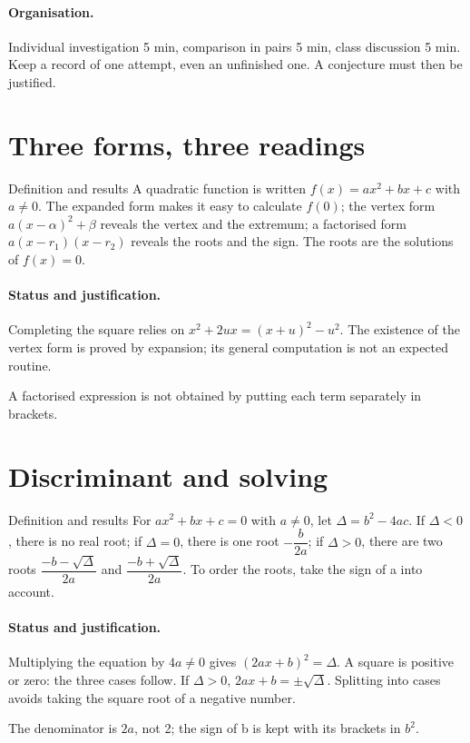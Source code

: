\paragraph{Organisation.} Individual investigation 5 min, comparison in pairs 5 min, class discussion 5 min. Keep a record of one attempt, even an unfinished one. A conjecture must then be justified.
\section{Three forms, three readings}\label{C02-U1}
\begin{repere}{Definition and results}
A quadratic function is written $f(x)=ax^2+bx+c$ with $a\ne0$. The expanded form makes it easy to calculate $f(0)$; the vertex form $a(x-\alpha)^2+\beta$ reveals the vertex and the extremum; a factorised form $a(x-r_1)(x-r_2)$ reveals the roots and the sign. The roots are the solutions of $f(x)=0$.
\end{repere}
\paragraph{Status and justification.} Completing the square relies on $x^2+2ux=(x+u)^2-u^2$. The existence of the vertex form is proved by expansion; its general computation is not an expected routine.
\label{C02-EX1}

\begin{erreur}A factorised expression is not obtained by putting each term separately in brackets.\end{erreur}
\label{C02-AP1}
\section{Discriminant and solving}\label{C02-U2}
\begin{repere}{Definition and results}
For $ax^2+bx+c=0$ with $a\ne0$, let $\Delta=b^2-4ac$. If $\Delta<0$, there is no real root; if $\Delta=0$, there is one root $-\dfrac{b}{2a}$; if $\Delta>0$, there are two roots $\dfrac{-b-\sqrt\Delta}{2a}$ and $\dfrac{-b+\sqrt\Delta}{2a}$. To order the roots, take the sign of a into account.
\end{repere}
\paragraph{Status and justification.} Multiplying the equation by $4a\ne0$ gives $(2ax+b)^2=\Delta$. A square is positive or zero: the three cases follow. If $\Delta>0$, $2ax+b=\pm\sqrt\Delta$. Splitting into cases avoids taking the square root of a negative number.
\label{C02-EX2}
\begin{erreur}The denominator is $2a$, not 2; the sign of b is kept with its brackets in $b^2$.\end{erreur}
\label{C02-AP2}
